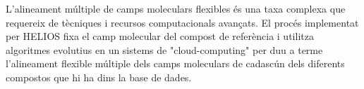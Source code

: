



L'alineament múltiple de camps moleculars flexibles és una taxa complexa que requereix de tècniques i recursos computacionals avançats. El procés implementat per HELIOS fixa el camp molecular del compost de referència i utilitza algoritmes evolutius en un sistems de "cloud-computing" per duu a terme l'alineament flexible múltiple dels camps moleculars de cadascún dels diferents compostos que hi ha dins la base de dades.

